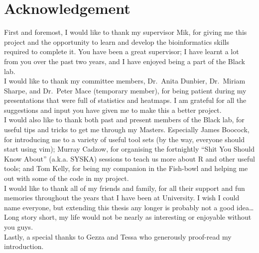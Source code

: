 
\vspace*{\fill}

\section*{\centering Acknowledgement}

First and foremost, I would like to thank my supervisor Mik, for giving me this project and the opportunity to learn and develop the bioinformatics skills required to complete it.
You have been a great supervisor; I have learnt a lot from you over the past two years, and I have enjoyed being a part of the Black lab.
\\

\noindent
I would like to thank my committee members, Dr.\ Anita Dunbier, Dr.\ Miriam Sharpe, and Dr.\ Peter Mace (temporary member), for being patient during my presentations that were full of statistics and heatmaps.
I am grateful for all the suggestions and input you have given me to make this a better project.
\\

\noindent
I would also like to thank both past and present members of the Black lab, for useful tips and tricks to get me through my Masters.
Especially James Boocock, for introducing me to a variety of useful tool sets (by the way, everyone should start using vim); Murray Cadzow, for organising the fortnightly ``Shit You Should Know About'' (a.k.a. SYSKA) sessions to teach us more about R and other useful tools; and Tom Kelly, for being my companion in the Fish-bowl and helping me out with some of the code in my project.
\\

\noindent
I would like to thank all of my friends and family, for all their support and fun memories throughout the years that I have been at University.
I wish I could name everyone, but extending this thesis any longer is probably not a good idea\ldots{}
Long story short, my life would not be nearly as interesting or enjoyable without you guys.
\\

\noindent
Lastly, a special thanks to Gezza and Tessa who generously proof-read my introduction.
\\

\vfill

